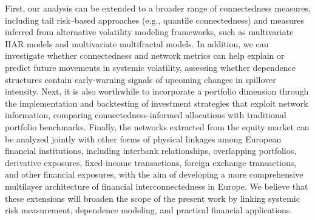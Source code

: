
First, our analysis can be extended to a broader range of connectedness measures, including tail risk--based approaches (e.g., quantile connectedness) and measures inferred from alternative volatility modeling frameworks, such as multivariate HAR models and multivariate multifractal models.
In addition, we can investigate whether connectedness and network metrics can help explain or predict future movements in systemic volatility, assessing whether dependence structures contain early-warning signals of upcoming changes in spillover intensity. Next, it is also worthwhile to incorporate a portfolio dimension through the implementation and backtesting of investment strategies that exploit network information, comparing connectedness-informed allocations with traditional portfolio benchmarks. Finally, the networks extracted from the equity market can be analyzed jointly with other forms of physical linkages among European financial institutions, including interbank relationships, overlapping portfolios, derivative exposures, fixed-income transactions, foreign exchange transactions, and other financial exposures, with the aim of developing a more comprehensive multilayer architecture of financial interconnectedness in Europe. We believe that these extensions will broaden the scope of the present work by linking systemic risk measurement, dependence modeling, and practical financial applications.
